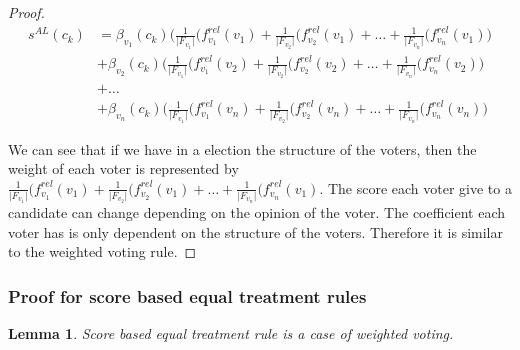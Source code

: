 \documentclass{article}
\newtheorem{lemma}[theorem]{Lemma}
\begin{document}
\begin{proof}
\begin{equation*}
\begin{split}
s^{AL}(c_k) &= \beta_{v_1}(c_k)\big(\frac{1}{\vert F_{v_1}\vert}(f_{v_1}^{rel}(v_1) +  \frac{1}{\vert F_{v_2}\vert}(f_{v_2}^{rel}(v_1)+ \dots +\frac{1}{\vert F_{v_n}\vert}(f_{v_n}^{rel}(v_1)\big) \\
            &+ \beta_{v_2}(c_k)\big(\frac{1}{\vert F_{v_1}\vert}(f_{v_1}^{rel}(v_2) +  \frac{1}{\vert F_{v_2}\vert}(f_{v_2}^{rel}(v_2)+ \dots +\frac{1}{\vert F_{v_n}\vert}(f_{v_n}^{rel}(v_2)\big) \\
             &+  \dots  \\
            &+ \beta_{v_n}(c_k)\big(\frac{1}{\vert F_{v_1}\vert}(f_{v_1}^{rel}(v_n) +  \frac{1}{\vert F_{v_2}\vert}(f_{v_2}^{rel}(v_n)+ \dots +\frac{1}{\vert F_{v_n}\vert}(f_{v_n}^{rel}(v_n)\big) 
\end{split}
\end{equation*}



We can see that if we have in a election the structure of the voters, then the weight of each voter is represented by $\frac{1}{\vert F_{v_1}\vert}(f_{v_1}^{rel}(v_1) +  \frac{1}{\vert F_{v_2}\vert}(f_{v_2}^{rel}(v_1)+ \dots +\frac{1}{\vert F_{v_n}\vert}(f_{v_n}^{rel}(v_1)$. The score each voter give to a candidate can change depending on the opinion of the voter. The coefficient each voter has is only dependent on the structure of the voters. Therefore it is similar to the weighted voting rule.
\end{proof}
\subsubsection{Proof for score based equal treatment rules}
\begin{lemma}
    Score based equal treatment rule is a case of  weighted voting.
\end{lemma}
\end{document}
